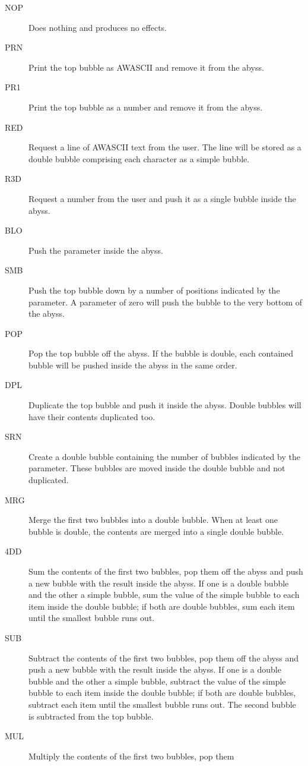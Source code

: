 \documentclass[11pt,a4paper,draft]{book}
\begin{document}
\begin{description}
\item[NOP] Does nothing and produces no effects.
\item[PRN] Print the top bubble as AWASCII and remove it from the abyss.
\item[PR1] Print the top bubble as a number and remove it from the abyss.
\item[RED] Request a line of AWASCII text from the user. The line will
  be stored as a double bubble comprising each character as a simple
  bubble.
\item[R3D] Request a number from the user and push it as a single
  bubble inside the abyss.
\item[BLO] Push the parameter inside the abyss.
\item[SMB] Push the top bubble down by a number of positions indicated
  by the parameter. A parameter of zero will push the bubble to the
  very bottom of the abyss.
\item[POP] Pop the top bubble off the abyss. If the bubble is double,
  each contained bubble will be pushed inside the abyss in the same
  order.
\item[DPL] Duplicate the top bubble and push it inside the
  abyss. Double bubbles will have their contents duplicated too.
\item[SRN] Create a double bubble containing the number of bubbles
  indicated by the parameter. These bubbles are moved inside the
  double bubble and not duplicated.
\item[MRG] Merge the first two bubbles into a double bubble. When at
  least one bubble is double, the contents are merged into a single
  double bubble.
\item[4DD] Sum the contents of the first two bubbles, pop them off the
  abyss and push a new bubble with the result inside the abyss. If one
  is a double bubble and the other a simple bubble, sum the value of
  the simple bubble to each item inside the double bubble; if both are
  double bubbles, sum each item until the smallest bubble runs out.
\item[SUB] Subtract the contents of the first two bubbles, pop them
  off the abyss and push a new bubble with the result inside the
  abyss. If one is a double bubble and the other a simple bubble,
  subtract the value of the simple bubble to each item inside the
  double bubble; if both are double bubbles, subtract each item until
  the smallest bubble runs out. The second bubble is subtracted from
  the top bubble.
\item[MUL] Multiply the contents of the first two bubbles, pop them

\end{description}
\end{document}
